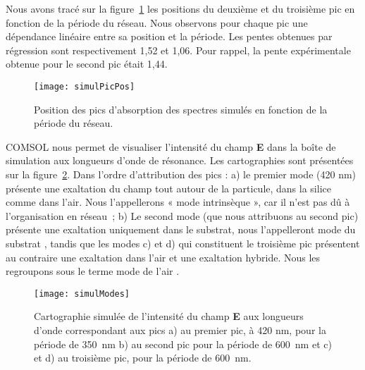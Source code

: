 Nous avons tracé sur la figure~\ref{simulPicPos} les positions du deuxième et du troisième pic en fonction de la période du réseau. Nous observons pour chaque pic une dépendance linéaire entre sa position et la période. Les pentes obtenues par régression sont respectivement 1,52 et 1,06. Pour rappel, la pente expérimentale obtenue pour le second pic était 1,44.\par 
\begin{figure}[!htb]
\centering
\texttt{[image: simulPicPos]}
\caption{Position des pics d'absorption des spectres simulés en fonction de la période du réseau.}
\label{simulPicPos}
\end{figure}

COMSOL nous permet de visualiser l'intensité du champ \textbf{E} dans la boîte de simulation aux longueurs d'onde de résonance. Les cartographies sont présentées sur la figure~\ref{simulModes}. Dans l'ordre d'attribution des pics : a) le premier mode (420 nm) présente une exaltation du champ tout autour de la particule, dans la silice comme dans l'air. Nous l'appellerons « mode intrinsèque », car il n'est pas dû à l'organisation en réseau~; b) Le second mode (que nous attribuons au second pic) présente une exaltation uniquement dans le substrat, nous l'appelleront \og mode du substrat \fg, tandis que les modes c) et d) qui constituent le troisième pic présentent au contraire une exaltation dans l'air et une exaltation hybride. Nous les regroupons sous le terme \og mode de l'air \fg.\par
\begin{figure}[!htb]
\centering
\texttt{[image: simulModes]}
\caption{Cartographie simulée de l'intensité du champ \textbf{E} aux longueurs d'onde correspondant aux pics a) au premier pic, à 420 nm, pour la période de 350~nm b) au second pic pour la période de 600~nm et c) et d) au troisième pic, pour la période de 600~nm.}
\label{simulModes}
\end{figure}

